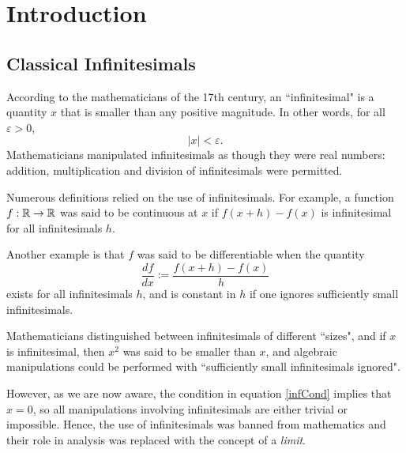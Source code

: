 
\chapter{Introduction} %

\label{Introduction} %



\section{Classical Infinitesimals}
According to the mathematicians of the 17th century, an ``infinitesimal"
is a quantity $x$ that is smaller than any positive magnitude. In other
words, for all $\varepsilon > 0$, 
\begin{equation}
\label{infCond}
    |x| < \varepsilon.
\end{equation}
Mathematicians manipulated infinitesimals
as though they were real numbers: addition, multiplication and division of infinitesimals
were permitted. 

Numerous definitions relied on the use of infinitesimals. For example,
a function $f:\mathbb{R}\rightarrow \mathbb{R}$ was said to be continuous at $x$
if $f(x+h)-f(x)$ is infinitesimal for all infinitesimals $h$.

Another example is that $f$ was said to be differentiable when the quantity
\begin{equation}
    \frac{df}{dx} := \frac{f(x+h)-f(x)}{h}
\end{equation}
exists for all infinitesimals $h$, and is constant in $h$ if one ignores
sufficiently small infinitesimals.

Mathematicians distinguished between infinitesimals of different ``sizes", 
and if $x$ is infinitesimal, then $x^2$ was said to be smaller than $x$,
and algebraic manipulations could be performed with ``sufficiently small
infinitesimals ignored".

However, as we are now aware, the condition in equation \ref{infCond} implies that $x = 0$, 
so all manipulations involving infinitesimals
are either trivial or impossible. Hence, the use 
of infinitesimals was banned from mathematics and their role
in analysis was replaced with the concept of a \emph{limit}.


